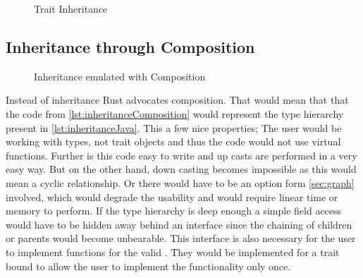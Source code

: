 \documentclass[thesis]{subfiles}
\begin{document}
  \begin{figure}[ht]
    \captionsetup{type=lstlisting}
    \usebox{\inheritanceOne}\hfill
    \usebox{\inheritanceTwo}
    \caption{Trait Inheritance}\label{lst:inheritance}
  \end{figure}

  \subsection{Inheritance through Composition}%
    \newsavebox{\inheritanceComposition}%
    \begin{lrbox}{\inheritanceComposition}%
      \begin{minipage}{.25\linewidth}%
      \end{minipage}%
    \end{lrbox}%
    \begin{wrapfigure}{r}{0.38\textwidth}%
      \vspace*{-\baselineskip}%
      \captionsetup{type=lstlisting}%
      \begin{center}%
        \usebox{\inheritanceComposition}%
      \end{center}%
      \vspace*{-\baselineskip}%
      \caption{Inheritance emulated with Composition}\label{lst:inheritanceComposition}%
    \end{wrapfigure}%
    Instead of inheritance Rust advocates composition.
    That would mean that that the code from \autoref{lst:inheritanceComposition} would represent the type hierarchy present in \autoref{lst:inheritanceJava}.
    This a few nice properties;
    The user would be working with types, not trait objects and thus the code would not use virtual functions.
    Further is this code easy to write and up casts are performed in a very easy way.
    But on the other hand, down casting becomes impossible as this would mean a cyclic relationship.
    Or there would have to be an option form \autoref{sec:graph} involved, which would degrade the usability and would require linear time or memory to perform.
    If the type hierarchy is deep enough a simple field access would have to be hidden away behind an interface since the chaining of children or parents would become unbearable.
    This interface is also necessary for the user to implement functions for the valid \structs.
    They would be implemented for a trait bound to allow the user to implement the functionality only once.
\end{document}
